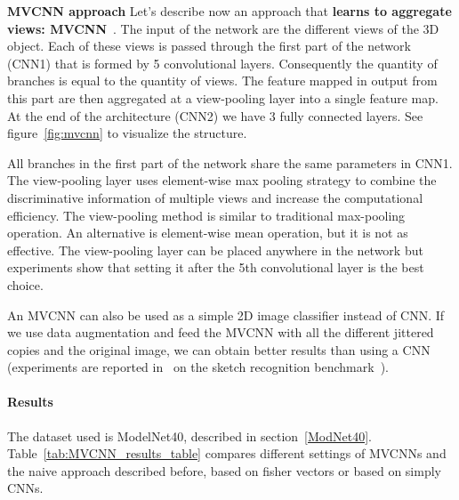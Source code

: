 \textbf{MVCNN approach} Let's describe now an approach that \textbf{learns to aggregate views: MVCNN}~\cite{LBMPFusion}. The input of the network are the different views of the 3D object. Each of these views is passed through the first part of the network (CNN1) that is formed by 5 convolutional layers. Consequently the quantity of branches is equal to the quantity of views. The feature mapped in output from this part are then aggregated at a view-pooling layer into a single feature map. At the end of the architecture (CNN2) we have 3 fully connected layers. See figure~\ref{fig:mvcnn} to visualize the structure.


All branches in the first part of the network share the same parameters in CNN1. The view-pooling layer uses element-wise max pooling strategy to combine the discriminative information of multiple views and increase the computational efficiency. The view-pooling method is similar to traditional max-pooling operation. An alternative is element-wise mean
operation, but it is not as effective. The view-pooling layer can be placed anywhere in the network but experiments show that setting it after the 5th convolutional layer is the best choice.

An MVCNN can also be used as a simple 2D image classifier instead of CNN. If we use data augmentation and feed the MVCNN with all the different jittered copies and the original image, we can obtain better results than using a CNN (experiments are reported in~\cite{multi_view} on the sketch recognition benchmark~\cite{eitz2012hdhso}).

\paragraph{Results}
The dataset used is ModelNet40, described in section~\ref{ModNet40}. Table~\ref{tab:MVCNN_results_table} compares different settings of MVCNNs and the naive approach described before, based on fisher vectors or based on simply CNNs.


